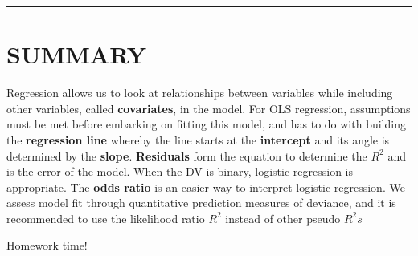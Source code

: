 \documentclass[
]{book}
\begin{document}
\begin{center}\rule{0.5\linewidth}{0.5pt}\end{center}

\hypertarget{summary-8}{%
\section{SUMMARY}\label{summary-8}}

Regression allows us to look at relationships between variables while including other variables, called \textbf{covariates}, in the model. For OLS regression, assumptions must be met before embarking on fitting this model, and has to do with building the \textbf{regression line} whereby the line starts at the \textbf{intercept} and its angle is determined by the \textbf{slope}. \textbf{Residuals} form the equation to determine the \(R^2\) and is the error of the model. When the DV is binary, logistic regression is appropriate. The \textbf{odds ratio} is an easier way to interpret logistic regression. We assess model fit through quantitative prediction measures of deviance, and it is recommended to use the likelihood ratio \(R^2\) instead of other pseudo \(R^2s\)

Homework time!
\end{document}
